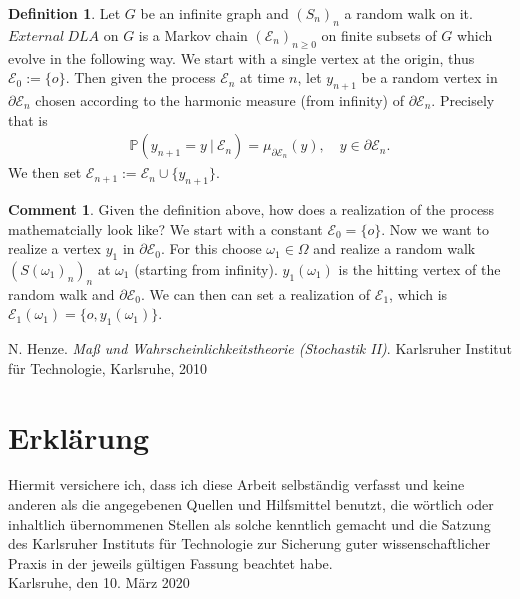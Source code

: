 \documentclass[12pt,a4paper]{scrartcl}
\numberwithin{equation}{section}
\numberwithin{equation}{section}%
\theoremstyle{definition}
\newtheorem{definition}[theorem]{Definition}
\theoremstyle{definition}
\newtheorem{com}[thm]{Comment}
\begin{document}
\begin{definition}
	Let $G$ be an infinite graph and $(S_n)_n$ a random walk on it. $External\ DLA$ on $G$ is a Markov chain $(\mathcal{E}_n)_{n\geq 0}$ on finite subsets of $G$ which evolve in the following way. We start with a single vertex at the origin, thus $\mathcal{E}_0 := \{o\}$. Then given the process $\mathcal{E}_n$ at time $n$, let $y_{n+1}$ be a random vertex in $\partial \mathcal{E}_n$ chosen according to the harmonic measure (from infinity) of $\partial \mathcal{E}_n$. Precisely that is
	\begin{align*}
		\mathbb{P}(y_{n+1}=y\ |\ \mathcal{E}_n) = \mu_{\partial \mathcal{E}_n}(y),\quad y\in \partial \mathcal{E}_n.
	\end{align*}
	We then set $\mathcal{E}_{n+1} := \mathcal{E}_n \cup \{y_{n+1}\}$.	
	
\end{definition}

\begin{com}
	Given the definition above, how does a realization of the process mathematcially look like? We start with a constant $\mathcal{E}_0 = \{o\}$. Now we want to realize a vertex $y_1$ in $\partial \mathcal{E}_0$. For this choose $\omega_1\in \Omega$ and realize a random walk $(S(\omega_1)_n)_n$ at $\omega_1$ (starting from infinity). $y_1(\omega_1)$ is the hitting vertex of the random walk and $\partial \mathcal{E}_0$. We can then can set a realization of $\mathcal{E}_1$, which is $\mathcal{E}_1(\omega_1)=\{o,y_1(\omega_1)\}$. 
\end{com}











\newpage



\begin{thebibliography}{Lam00}
\thispagestyle{empty}

N. Henze.
\emph{Maß und Wahrscheinlichkeitstheorie (Stochastik II)}.
Karlsruher Institut für Technologie, Karlsruhe, 2010

\end{thebibliography}

\newpage
  
\thispagestyle{empty}

\vspace*{8cm}


\section*{Erklärung}

Hiermit versichere ich, dass ich diese Arbeit selbständig verfasst und keine anderen als die angegebenen Quellen und Hilfsmittel benutzt, die wörtlich oder inhaltlich übernommenen Stellen als solche kenntlich gemacht und die Satzung des Karlsruher Instituts für Technologie zur Sicherung guter wissenschaftlicher Praxis in der jeweils gültigen Fassung beachtet habe. \\[2ex] 

\noindent
Karlsruhe, den 10. März 2020\\[5ex] 
\end{document}
